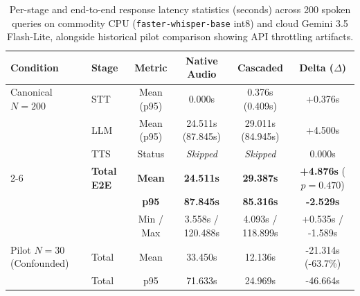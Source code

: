 \begin{table}[t]
\centering
\small
\caption{Per-stage and end-to-end response latency statistics (seconds) across 200 spoken queries on commodity CPU (\texttt{faster-whisper-base} int8) and cloud Gemini 3.5 Flash-Lite, alongside historical pilot comparison showing API throttling artifacts.}
\label{tab:latency}
\begin{tabular}{llcccc}
\toprule
\textbf{Condition} & \textbf{Stage} & \textbf{Metric} & \textbf{Native Audio} & \textbf{Cascaded} & \textbf{Delta ($\Delta$)} \\
\midrule
Canonical $N=200$ & STT & Mean (p95) & 0.000s & 0.376s (0.409s) & +0.376s \\
 & LLM & Mean (p95) & 24.511s (87.845s) & 29.011s (84.945s) & +4.500s \\
 & TTS & Status & \textit{Skipped} & \textit{Skipped} & 0.000s \\
\cmidrule{2-6}
 & \textbf{Total E2E} & \textbf{Mean} & \textbf{24.511s} & \textbf{29.387s} & \textbf{+4.876s} ($p=0.470$) \\
 & & \textbf{p95} & \textbf{87.845s} & \textbf{85.316s} & \textbf{-2.529s} \\
 & & Min / Max & 3.558s / 120.488s & 4.093s / 118.899s & +0.535s / -1.589s \\
\midrule
Pilot $N=30$ (Confounded) & Total & Mean & 33.450s & 12.136s & -21.314s (-63.7\%) \\
 & Total & p95 & 71.633s & 24.969s & -46.664s \\
\bottomrule
\end{tabular}
\end{table}
